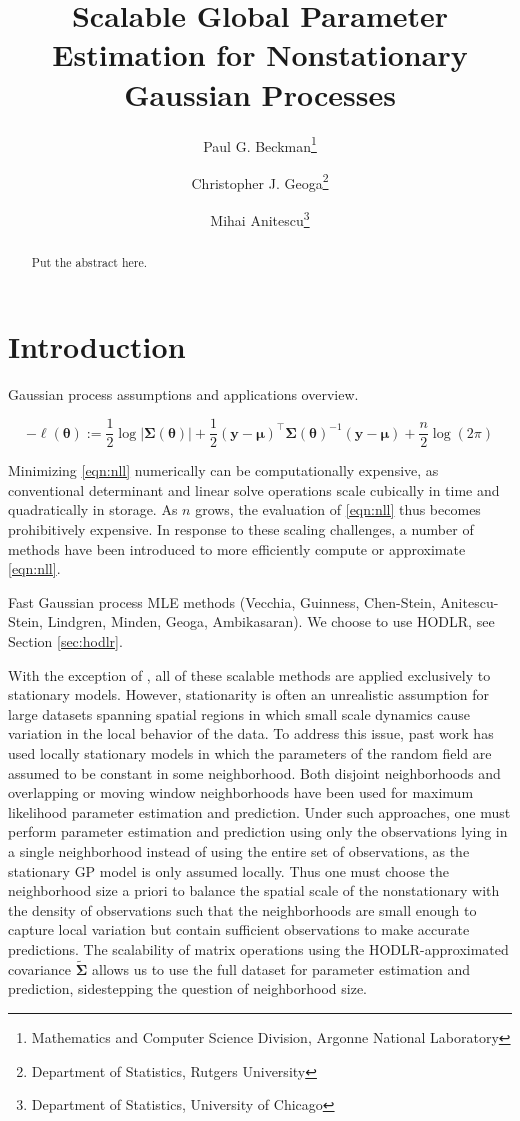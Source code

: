 \documentclass{article}
\title{\textbf{Scalable Global Parameter Estimation for Nonstationary Gaussian Processes}}
\date{}
\author{
Paul G. Beckman\thanks{Mathematics and Computer Science Division, Argonne National Laboratory} \and
Christopher J. Geoga\footnotemark[1] \thanks{Department of Statistics, Rutgers University} \and
Mihai Anitescu\footnotemark[1] \thanks{Department of Statistics, University of Chicago}
}
\newcommand{\abs}[1]{\left|#1\right|}
\numberwithin{equation}{section}
\newcommand{\cm}{\bm{\Sigma}}
\newcommand{\y}{\bm{y}}
\begin{document}
\maketitle

\vspace{-2\baselineskip}

\begin{abstract}
Put the abstract here.
\end{abstract}

\section{Introduction}

Gaussian process assumptions and applications overview.

\begin{equation}
  -\ell(\bm{\theta}) := \frac{1}{2}\log\abs{\cm(\bm{\theta})} + \frac{1}{2}(\y-\bm{\mu})^\top\cm(\bm{\theta})^{-1}(\y-\bm{\mu}) + \frac{n}{2}\log(2\pi)
  \label{eqn:nll}
\end{equation}

Minimizing \ref{eqn:nll} numerically can be computationally expensive, as conventional determinant and linear solve operations scale cubically in time and quadratically in storage. As $n$ grows, the evaluation of \ref{eqn:nll} thus becomes prohibitively expensive. In response to these scaling challenges, a number of methods have been introduced to more efficiently compute or approximate \ref{eqn:nll}.

Fast Gaussian process MLE methods (Vecchia, Guinness, Chen-Stein, Anitescu-Stein, Lindgren, Minden, Geoga, Ambikasaran). We choose to use HODLR, see Section \ref{sec:hodlr}.

With the exception of \cite{guinness2019gaussian}, all of these scalable methods are applied exclusively to stationary models. However, stationarity is often an unrealistic assumption for large datasets spanning spatial regions in which small scale dynamics cause variation in the local behavior of the data. To address this issue, past work has used locally stationary models in which the parameters of the random field are assumed to be constant in some neighborhood. Both disjoint neighborhoods \cite{lenzi2019improving} and overlapping or moving window neighborhoods \cite{kuusela2018locally, anderes2011local} have been used for maximum likelihood parameter estimation and prediction. Under such approaches, one must perform parameter estimation and prediction using only the observations lying in a single neighborhood instead of using the entire set of observations, as the stationary GP model is only assumed locally. Thus one must choose the neighborhood size a priori to balance the spatial scale of the nonstationary with the density of observations such that the neighborhoods are small enough to capture local variation but contain sufficient observations to make accurate predictions. The scalability of matrix operations using the HODLR-approximated covariance $\bm{\widetilde{\Sigma}}$ allows us to use the full dataset for parameter estimation and prediction, sidestepping the question of neighborhood size.
\end{document}
